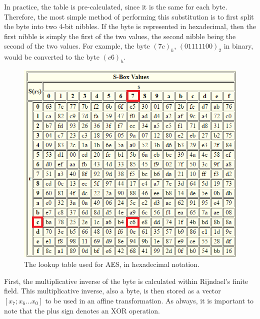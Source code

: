 \documentclass[12pt]{report}
\theoremstyle{definition}
\theoremstyle{remark}
\begin{document}
In practice, the table is pre-calculated, since it is the same for each byte. Therefore, the most simple method of performing this substitution is to first split the byte into two 4-bit nibbles. If the byte is represented in hexadecimal, then the first nibble is simply the first of the two values, the second nibble being the second of the two values. For example, the byte $(7c)_h$, $(01111100)_2$ in binary, would be converted to the byte $(c6)_h$.

\begin{figure}[H]
\centering
\includegraphics[scale=1]{SBox.PNG}
\caption{The lookup table used for AES, in hexadecimal notation\cite{SBox}.}
\end{figure}

First, the multiplicative inverse of the byte is calculated within Rijndael's finite field. This multiplicative inverse, also a byte, is then stored as a vector $[x_7; x_6 ... x_0]$ to be used in an affine transformation. As always, it is important to note that the plus sign denotes an XOR operation.
\end{document}
